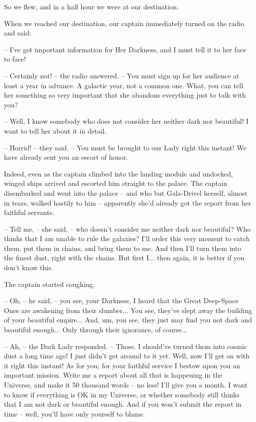 \documentclass[ebook,oneside,final,openright]{memoir}
\begin{document}
So we flew, and in a half hour we were at our destination.\par
\par
When we reached our destination, our captain immediately turned on the radio and said:\par
– I’ve got important information for Her Darkness, and I must tell it to her face to face!\par
– Certainly not! – the radio answered. – You must sign up for her audience at least a year in advance. A galactic year, not a common one. What, you can tell her something so very important that she abandons everything just to talk with you?\par
– Well, I know somebody who does not consider her neither dark nor beautiful! I want to tell her about it in detail.\par
– Horrid! – they said. – You must be brought to our Lady right this instant! We have already sent you an escort of honor.\par
\par
Indeed, even as the captain climbed into the landing module and undocked, winged ships arrived and escorted him straight to the palace. The captain disembarked and went into the palace – and who but Gala-Drivel herself, almost in tears, walked hastily to him – apparently she’d already got the report from her faithful servants.\par
– Tell me, – she said, – who doesn’t consider me neither dark nor beautiful? Who thinks that I am unable to rule the galaxies? I’ll order this very moment to catch them, put them in chains, and bring them to me. And then I’ll turn them into the finest dust, right with the chains. But first I... then again, it is better if you don’t know this.\par
The captain started coughing.\par
– Oh, – he said, – you see, your Darkness, I heard that the Great Deep-Space Ones are awakening from their slumber... You see, they’ve slept away the building of your beautiful empire... And, um, you see, they just may find you not dark and beautiful enough... Only through their ignorance, of course...\par
– Ah, – the Dark Lady responded. – Those. I should’ve turned them into cosmic dust a long time ago! I just didn’t get around to it yet. Well, now I’ll get on with it right this instant! As for you, for your faithful service I bestow upon you an important mission. Write me a report about all that is happening in the Universe, and make it 50 thousand words – no less! I’ll give you a month. I want to know if everything is OK in my Universe, or whether somebody still thinks that I am not dark or beautiful enough. And if you won’t submit the report in time – well, you’ll have only yourself to blame.\par
\end{document}

